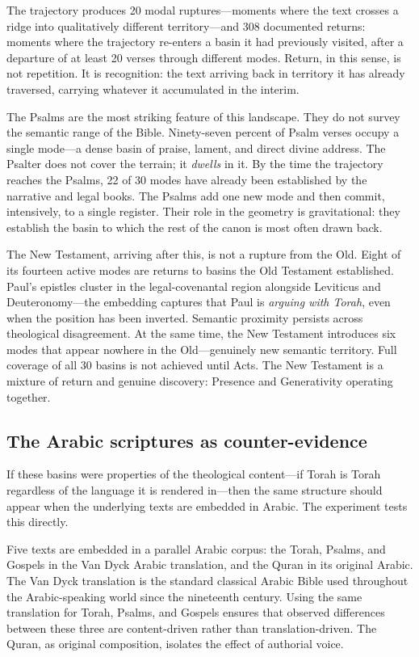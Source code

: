 The trajectory produces 20 modal ruptures---moments where the text crosses a ridge into qualitatively different territory---and 308 documented returns: moments where the trajectory re-enters a basin it had previously visited, after a departure of at least 20 verses through different modes. Return, in this sense, is not repetition. It is recognition: the text arriving back in territory it has already traversed, carrying whatever it accumulated in the interim.

The Psalms are the most striking feature of this landscape. They do not survey the semantic range of the Bible. Ninety-seven percent of Psalm verses occupy a single mode---a dense basin of praise, lament, and direct divine address. The Psalter does not cover the terrain; it \textit{dwells} in it. By the time the trajectory reaches the Psalms, 22 of 30 modes have already been established by the narrative and legal books. The Psalms add one new mode and then commit, intensively, to a single register. Their role in the geometry is gravitational: they establish the basin to which the rest of the canon is most often drawn back.

The New Testament, arriving after this, is not a rupture from the Old. Eight of its fourteen active modes are returns to basins the Old Testament established. Paul's epistles cluster in the legal-covenantal region alongside Leviticus and Deuteronomy---the embedding captures that Paul is \emph{arguing with Torah}, even when the position has been inverted. Semantic proximity persists across theological disagreement. At the same time, the New Testament introduces six modes that appear nowhere in the Old---genuinely new semantic territory. Full coverage of all 30 basins is not achieved until Acts. The New Testament is a mixture of return and genuine discovery: Presence and Generativity operating together.

\subsection{The Arabic scriptures as counter-evidence}

If these basins were properties of the theological content---if Torah is Torah regardless of the language it is rendered in---then the same structure should appear when the underlying texts are embedded in Arabic. The experiment tests this directly.

Five texts are embedded in a parallel Arabic corpus: the Torah, Psalms, and Gospels in the Van Dyck Arabic translation, and the Quran in its original Arabic. The Van Dyck translation is the standard classical Arabic Bible used throughout the Arabic-speaking world since the nineteenth century. Using the same translation for Torah, Psalms, and Gospels ensures that observed differences between these three are content-driven rather than translation-driven. The Quran, as original composition, isolates the effect of authorial voice.


